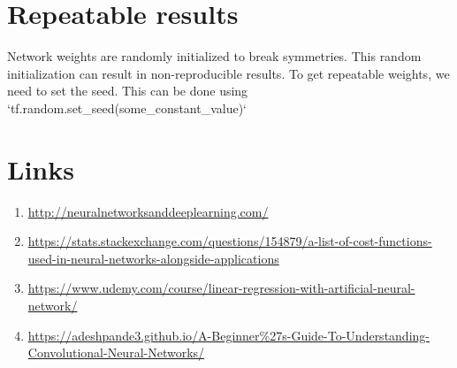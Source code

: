 \documentclass{article}
\begin{document}
\section{Repeatable results}
Network weights are randomly initialized to break symmetries. This random initialization can result in non-reproducible results. To get repeatable weights, we need to set the seed. This can be done using `tf.random.set\_seed(some\_constant\_value)`
\section{Links}
\begin{enumerate}
\item{\url{http://neuralnetworksanddeeplearning.com/}}
\item{\url{https://stats.stackexchange.com/questions/154879/a-list-of-cost-functions-used-in-neural-networks-alongside-applications}}
\item{\url{https://www.udemy.com/course/linear-regression-with-artificial-neural-network/}}
\item{\url{https://adeshpande3.github.io/A-Beginner%27s-Guide-To-Understanding-Convolutional-Neural-Networks/}}
\end{enumerate}
\end{document}
